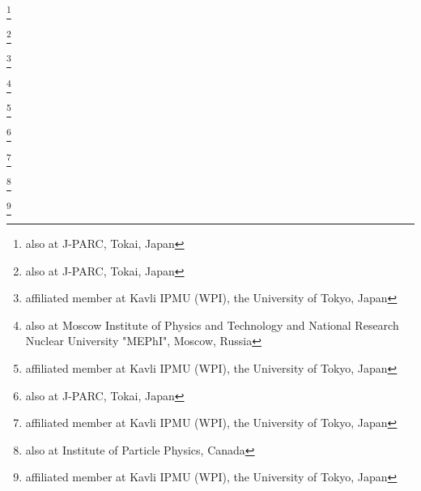\author{S.\,Bhadra}\INSTH
\author{A.\,Blondel}\INSTEG
\author{S.\,Bordoni }\INSTED
\author{A.\,Bravar}\INSTEG
\author{C.\,Bronner}\INSTCD
\author{J.\,Caravaca Rodr\'iguez}\INSTED
\author{M.\,Dziewiecki}\INSTDH
\author{T.\,Feusels}\INSTD
\author{G.A.\,Fiorentini\,Aguirre}\INSTH
\author{M.\,Friend}\thanks{also at J-PARC, Tokai, Japan}\INSTCB
\author{L.\,Haegel}\INSTEG
\author{M.\,Hartz}\INSTHA\INSTB
\author{R.\,Henderson}\INSTB
\author{T.\,Ishida}\thanks{also at J-PARC, Tokai, Japan}\INSTCB
\author{M.\,Ishitsuka}\INSTGK
\author{C.K.\,Jung}\thanks{affiliated member at Kavli IPMU (WPI), the University of Tokyo, Japan}\INSTFJ
\author{A.C.\,Kaboth}\INSTEI
\author{H.\,Kakuno}\INSTGI
\author{H.\,Kamano}\INSTCJ
\author{A.\,Konaka}\INSTB
\author{Y.\,Kudenko}\thanks{also at Moscow Institute of Physics and Technology and National Research Nuclear University "MEPhI", Moscow, Russia}\INSTEB
\author{M.\,Kuze}\INSTGK
\author{T.\,Lindner}\INSTB
\author{K.\,Mahn}\INSTM
\author{J.F.\,Martin}\INSTF
\author{J.\,Marzec}\INSTDH
\author{K.S.\,McFarland}\INSTGD
\author{S.\,Nakayama}\thanks{affiliated member at Kavli IPMU (WPI), the University of Tokyo, Japan}\INSTBJ
\author{T.\,Nakaya}\INSTCD\INSTHA
\author{S.\,Nakamura}\INSTCI
\author{Y.\,Nishimura}\INSTCG
\author{A.\,Rychter}\INSTDH
\author{F.\,S\'anchez}\INSTED
\author{T.\,Sato}\INSTCI
\author{M.\,Scott}\INSTB
\author{T.\,Sekiguchi}\thanks{also at J-PARC, Tokai, Japan}\INSTCB
\author{M.\,Shiozawa}\INSTBJ\INSTHA
\author{T.\,Sumiyoshi}\INSTGI
\author{R.\,Tacik}\INSTE\INSTB
\author{H.K.\,Tanaka}\thanks{affiliated member at Kavli IPMU (WPI), the University of Tokyo, Japan}\INSTBJ
\author{H.A.\,Tanaka}\thanks{also at Institute of Particle Physics, Canada}\INSTD
\author{S.\,Tobayama}\INSTD
\author{M.\,Vagins}\INSTHA\INSTGA
\author{J.\,Vo}\INSTED
\author{D.\,Wark}\INSTEH\INSTEI
\author{M.O.\,Wascko}\INSTEI
\author{M.J.\,Wilking}\INSTFJ
\author{S.\,Yen}\INSTB
\author{M.\,Yokoyama}\thanks{affiliated member at Kavli IPMU (WPI), the University of Tokyo, Japan}\INSTCH
\author{M.\,Ziembicki}\INSTDH

\noaffiliation
